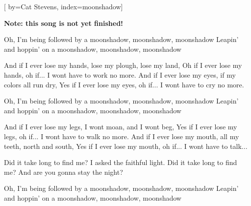 

[%
    by={Cat Stevens},
    index={moonshadow}]


    \label{moonshadow}

    \textbf{Note: this song is not yet finished!}

    \beginverse
        Oh, I'm being followed by a moonshadow, moonshadow, moonshadow
        Leapin' and hoppin' on a moonshadow, moonshadow, moonshadow

        And if I ever lose my hands, lose my plough, lose my land,
        Oh if I ever lose my hands, oh if... I wont have to work no more.
        And if I ever lose my eyes, if my colors all run dry,
        Yes if I ever lose my eyes, oh if... I wont have to cry no more.


        Oh, I'm being followed by a moonshadow, moonshadow, moonshadow
        Leapin' and hoppin' on a moonshadow, moonshadow, moonshadow

        And if I ever lose my legs, I wont moan, and I wont beg,
        Yes if I ever lose my legs, oh if... I wont have to walk no more.
        And if I ever lose my mouth, all my teeth, north and south,
        Yes if I ever lose my mouth, oh if... I wont have to talk...

        Did it take long to find me? I asked the faithful light.
        Did it take long to find me? And are you gonna stay the night?

        Oh, I'm being followed by a moonshadow, moonshadow, moonshadow
        Leapin' and hoppin' on a moonshadow, moonshadow, moonshadow
    \endverse
\endsong
